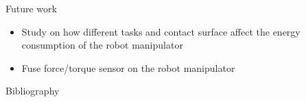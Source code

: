 \documentclass[aspectratio=169]{beamer}
\begin{document}
  \begin{frame}{Future work}
    \begin{itemize}
      \item Study on how \alert{different tasks and contact surface} affect the
      energy consumption of the robot manipulator
      \item Fuse force/torque sensor on the robot manipulator
    \end{itemize}
  \end{frame}



    \begin{frame}[allowframebreaks]{Bibliography}
      \printbibliography
    \end{frame}



\end{document}
